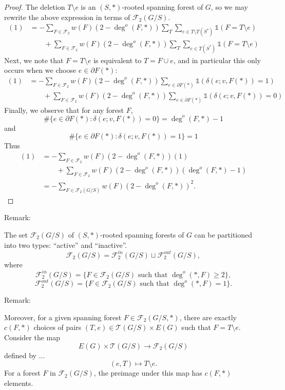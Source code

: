 \documentclass{amsart}
\theoremstyle{definition}
\newcommand{\one}{\mathds{1}}
\newcommand{\trees}{\mathcal{T}}
\newcommand{\forests}{\mathcal{F}}
\begin{document}
\begin{proof}
The deletion $T \setminus e$ is an $(S,*)$-rooted spanning forest of $G$,
so we may rewrite the above expression in terms of $\forests_2(G/S)$.
\begin{align*}
(1) &= - \sum_{F \in \forests_2} w(F) (2 - \deg^o(F,*)) \sum_{T} \sum_{e \in T\setminus T(S^*)} \one(F = T \setminus e)  \\
&\qquad +  \sum_{F \in \forests_2} w(F) (2 - \deg^o(F,*)) \sum_{T} \sum_{e \in T(S^*)} \one(F = T \setminus e) 
\end{align*}
Next, we note that $F = T \setminus e$ is equivalent to $T = F \cup e$, and in particular this only occurs when we choose $e \in \partial F(*)$:
\begin{align*}
(1) &= - \sum_{F \in \forests_2} w(F) (2 - \deg^o(F,*))  \sum_{e \in \partial F(*)} \one( \delta(e; v, F(*)) = 1)  \\
&\qquad +  \sum_{F \in \forests_2} w(F) (2 - \deg^o(F,*)) \sum_{e\in \partial F(*)} \one(\delta(e; v, F(*))=0) 
\end{align*}
Finally, we observe that for any forest $F$,
$$
\#\{e \in \partial F(*) : \delta(e;v, F(*)) = 0 \} = \deg^o(F,*) - 1
$$
and
$$
\#\{e \in \partial F(*) : \delta(e;v, F(*)) = 1 \} = 1
$$
Thus
\begin{align*}
(1) 
&= - \sum_{F \in \forests_2} w(F) (2 - \deg^o(F,*))  (1)  \\
&\qquad +  \sum_{F \in \forests_2} w(F) (2 - \deg^o(F,*)) (\deg^o(F,*) - 1) \\
&= - \!\!\!\sum_{F \in \forests_2(G/S)} w(F) (2 - \deg^o(F,*))^2 .
\end{align*}

\end{proof}


Remark: 

The set $\forests_2(G/S)$ of $(S,*)$-rooted spanning forests of $G$ can be partitioned into two types: ``active'' and ``inactive''.
$$
\forests_2(G/S) = \forests_2^{in}(G/S) \sqcup \forests_2^{out}(G/S),
$$
where
$$
\forests_2^{in}(G/S)  = \{ F \in \forests_2(G/S) \text{ such that } \deg^o(*,F) \geq 2\},
$$
$$
\forests_2^{out}(G/S)  = \{ F \in \forests_2(G/S) \text{ such that } \deg^o(*,F) = 1\}.
$$

Remark:

Moreover, for a given spanning forest
$F \in \forests_2(G/S, *)$,
there are exactly $c(F, *)$ choices of pairs $(T,e) \in \trees(G/S) \times E(G)$ such that
$F = T \setminus e.$
Consider the map
$$
E(G) \times \trees(G/S) \to \forests_2(G/S)
$$
defined by ...
$$
(e, T) \mapsto T \setminus e .
$$
For a forest $F$ in $\forests_2(G/S)$,
the preimage under this map has $c(F,*)$ elements.
\end{document}
